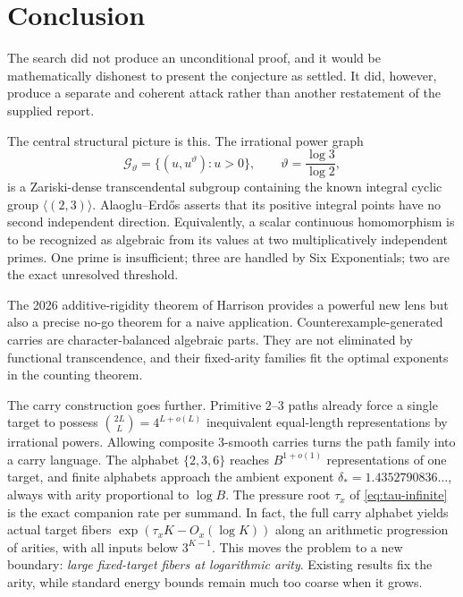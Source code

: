 \documentclass[11pt,oneside]{article}
\theoremstyle{definition}
\newcommand{\cG}{\mathscr{G}}
\begin{document}
\section{Conclusion}

The search did not produce an unconditional proof, and it would be mathematically dishonest to present the conjecture as settled.  It did, however, produce a separate and coherent attack rather than another restatement of the supplied report.

The central structural picture is this.  The irrational power graph
\[
       \cG_{\vartheta}=\{(u,u^{\vartheta}):u>0\},
       \qquad \vartheta=\frac{\log3}{\log2},
\]
is a Zariski-dense transcendental subgroup containing the known integral cyclic group $\langle(2,3)\rangle$.  Alaoglu--Erd\H{o}s asserts that its positive integral points have no second independent direction.  Equivalently, a scalar continuous homomorphism is to be recognized as algebraic from its values at two multiplicatively independent primes.  One prime is insufficient; three are handled by Six Exponentials; two are the exact unresolved threshold.

The 2026 additive-rigidity theorem of Harrison provides a powerful new lens but also a precise no-go theorem for a naive application.  Counterexample-generated carries are character-balanced algebraic parts.  They are not eliminated by functional transcendence, and their fixed-arity families fit the optimal exponents in the counting theorem.

The carry construction goes further.  Primitive $2$--$3$ paths already force a single target to possess
$\binom{2L}{L}=4^{L+o(L)}$ inequivalent equal-length representations by irrational powers.  Allowing composite $3$-smooth carries turns the path family into a carry language.  The alphabet $\{2,3,6\}$ reaches $B^{1+o(1)}$ representations of one target, and finite alphabets approach the ambient exponent
$\delta_*=1.4352790836\ldots$, always with arity proportional to $\log B$.  The pressure root $\tau_x$ of \eqref{eq:tau-infinite} is the exact companion rate per summand.  In fact, the full carry alphabet yields actual target fibers
$\exp(\tau_xK-O_x(\log K))$ along an arithmetic progression of arities, with all inputs below $3^{K-1}$.  This moves the problem to a new boundary: \emph{large fixed-target fibers at logarithmic arity}.  Existing results fix the arity, while standard energy bounds remain much too coarse when it grows.
\end{document}
